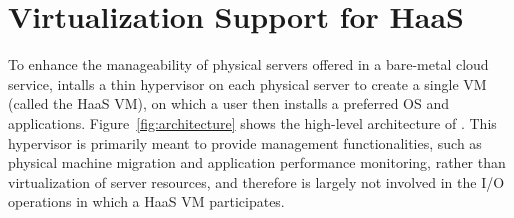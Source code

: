 \section{Virtualization Support for HaaS}



To enhance the manageability of physical servers offered in a bare-metal cloud service, \na intalls 
a thin hypervisor on each physical server  to create a single VM (called the HaaS VM), on which 
a \na user then installs a preferred OS and applications. 
Figure~\ref{fig:architecture} shows the high-level architecture of \na.
This  hypervisor is primarily meant to provide management functionalities, such as 
physical machine migration and application performance monitoring, rather than virtualization 
of server resources, and therefore is largely not involved in the I/O operations in which a HaaS VM participates.

